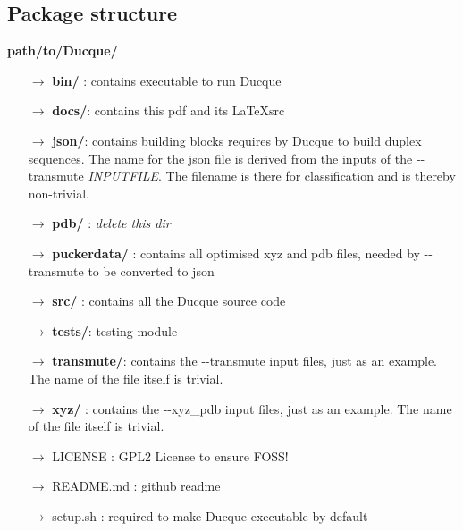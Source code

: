 \pagebreak
\subsection{Package structure}
%
%
\textbf{path/to/Ducque/}
\begin{itemize}[leftmargin=*]
    \setlength\itemsep{-1mm}
    \item[$\rightarrow$]\textbf{bin/} : contains executable to run Ducque
    \item[$\rightarrow$]\textbf{docs/}: contains this pdf and its \LaTeX src
    \item[$\rightarrow$]\textbf{json/}: contains building blocks requires by Ducque to build duplex sequences.
        The name for the json file is derived from the inputs of the -{}-transmute \textit{INPUTFILE}. The filename is there for classification and is thereby non-trivial.
    \item[$\rightarrow$]\textbf{pdb/} : \textit{delete this dir}
    \item[$\rightarrow$]\textbf{puckerdata/} : contains all optimised xyz and pdb files, needed by -{}-transmute to be converted to json
    \item[$\rightarrow$]\textbf{src/} : contains all the Ducque source code
    \item[$\rightarrow$]\textbf{tests/}: testing module
    \item[$\rightarrow$]\textbf{transmute/}: contains the -{}-transmute input files, just as an example. The name of the file itself is trivial.
    \item[$\rightarrow$]\textbf{xyz/} : contains the -{}-xyz\_pdb input files, just as an example. The name of the file itself is trivial.
    \item[$\rightarrow$]LICENSE : GPL2 License to ensure FOSS!
    \item[$\rightarrow$]README.md : github readme
    \item[$\rightarrow$]setup.sh : required to make Ducque executable by default

    
\end{itemize}
